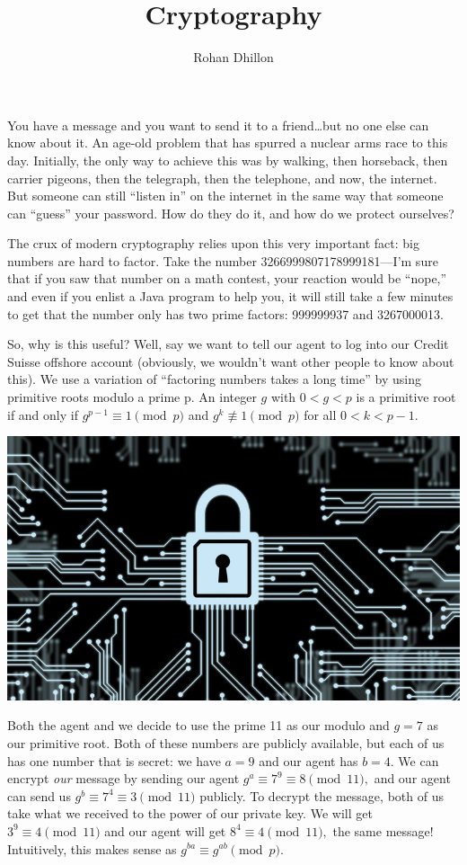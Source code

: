 \documentclass{article}
\title{Cryptography}
\author{Rohan Dhillon}
\begin{document}
\maketitle
You have a message and you want to send it to a friend…but no one else can know about it. An age-old problem that has spurred a nuclear arms race to this day. Initially, the only way to achieve this was by walking, then horseback, then carrier pigeons, then the telegraph, then the telephone, and now, the internet. But someone can still “listen in” on the internet in the same way that someone can “guess” your password. How do they do it, and how do we protect ourselves?

The crux of modern cryptography relies upon this very important fact: big numbers are hard to factor. Take the number 3266999807178999181—I’m sure that if you saw that number on a math contest, your reaction would be “nope,” and even if you enlist a Java program to help you, it will still take a few minutes to get that the number only has two prime factors: 999999937 and 3267000013. 

So, why is this useful? Well, say we want to tell our agent to log into our Credit Suisse offshore account (obviously, we wouldn't want other people to know about this). We use a variation of “factoring numbers takes a long time” by using primitive roots modulo a prime p. An integer $g$ with $0<g<p$ is a primitive root if and only if $g^{p-1} \equiv 1 \pmod{p}$ and $g^k \not\equiv 1 \pmod{p}$ for all $0 < k < p-1$. 

\begin{center}
\includegraphics[scale=0.5]{images/crypto.png}
\end{center}

Both the agent and we decide to use the prime 11 as our modulo and $g=7$ as our primitive root. Both of these numbers are publicly available, but each of us has one number that is secret: we have $a=9$ and our agent has $b=4$. We can encrypt \textit{our} message by sending our agent $g^a \equiv 7^9 \equiv 8 \pmod{11},$ and our agent can send us $g^b \equiv 7^4 \equiv 3 \pmod{11}$ publicly. To decrypt the message, both of us take what we received to the power of our private key. We will get $3^9 \equiv 4 \pmod{11}$ and our agent will get $8^4 \equiv 4 \pmod{11},$ the same message! Intuitively, this makes sense as $g^{ba} \equiv g^{ab} \pmod{p}.$
\end{document}
